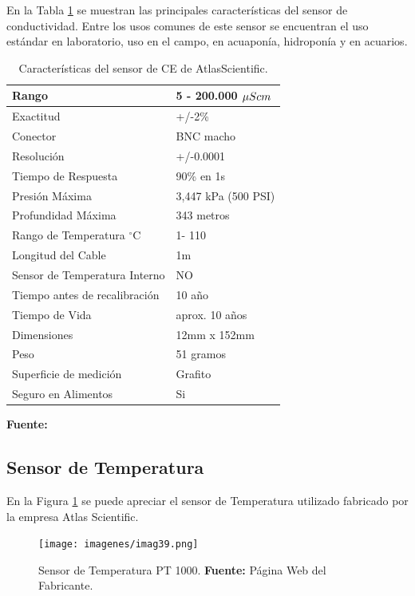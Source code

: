 En la Tabla \ref{tab:caract_ce} se muestran las principales características del sensor de conductividad.
Entre los usos comunes de este sensor se encuentran el uso estándar en laboratorio, uso en el campo, en acuaponía, hidroponía y en acuarios.
\begin{table}[H]
\protect\caption[Características del sensor de CE de AtlasScientific]{Características del sensor de CE de AtlasScientific.}
\label{tab:caract_ce}
\begin{center}
\begin{tabular}{|l|l|}
\hline
Rango    &  5 - 200.000 $\mu S\/cm$\\
\hline
Exactitud      &  +/-2\% \\
\hline
Conector &  BNC macho\\
\hline
Resolución   &  +/-0.0001\\
\hline
Tiempo de Respuesta   &  90\% en 1s\\
\hline
Presión Máxima    &  3,447 kPa (500 PSI) \\
\hline
Profundidad Máxima	& 343 metros\\
\hline
Rango de Temperatura $^{\circ}$C	& 1- 110\\
\hline
Longitud del Cable	& 1m\\
\hline
Sensor de Temperatura Interno	& NO\\
\hline
Tiempo antes de recalibración	& 10 año\\
\hline
Tiempo de Vida	& aprox. 10 años\\
\hline
Dimensiones	& 12mm x 152mm\\
\hline
Peso	& 51 gramos\\
\hline
Superficie de medición	& Grafito\\
\hline
Seguro en Alimentos	& Si\\
\hline
\end{tabular}
\vspace{5mm}
\newline
\hfill \textbf{Fuente:} \cite{atlasce}
\end{center}
\end{table}

\subsection{Sensor de Temperatura}
En la Figura \ref{fig:4.15}  se puede apreciar el sensor de Temperatura utilizado fabricado por la empresa Atlas Scientific.


\begin{figure}[t]
    \centering
    \texttt{[image: imagenes/imag39.png]}
    \caption[Sensor de Temperatura PT 1000]{Sensor de Temperatura PT 1000. \textbf{Fuente: } Página Web del Fabricante. }
    \label{fig:4.15}
\end{figure}


